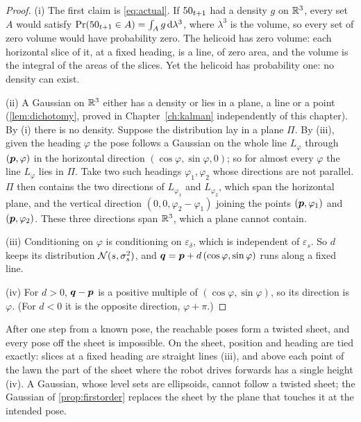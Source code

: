 \begin{proof}
(i) The first claim is \eqref{eq:actual}. If $50_{t+1}$ had a density $g$
on $\mathbb{R}^3$, every set $A$ would satisfy
$\Pr(50_{t+1}\in A)=\int_Ag\,\mathrm d\lambda^3$, where $\lambda^3$ is
the volume, so every set of zero volume would have probability zero. The
helicoid has zero volume: each horizontal slice of it, at a fixed heading,
is a line, of zero area, and the volume is the integral of the areas of the
slices. Yet the helicoid has probability one: no density can exist.

(ii) A Gaussian on $\mathbb{R}^3$ either has a density or lies in a plane, a line
or a point (\cref{lem:dichotomy}, proved in Chapter~\ref{ch:kalman}
independently of this chapter). By (i) there is no density. Suppose the
distribution lay in a plane $\Pi$. By (iii), given the heading $\varphi$
the pose follows a Gaussian on the whole line $L_\varphi$ through
$(\bm{p},\varphi)$ in the horizontal direction $(\cos\varphi,\sin\varphi,0)$;
so for almost every $\varphi$ the line $L_\varphi$ lies in $\Pi$. Take two
such headings $\varphi_1,\varphi_2$ whose directions are not parallel.
$\Pi$ then contains the two directions of $L_{\varphi_1}$ and
$L_{\varphi_2}$, which span the horizontal plane, and the vertical
direction $(0,0,\varphi_2-\varphi_1)$ joining the points $(\bm{p},\varphi_1)$
and $(\bm{p},\varphi_2)$. These three directions span $\mathbb{R}^3$, which a plane
cannot contain.

(iii) Conditioning on $\varphi$ is conditioning on $\varepsilon_\delta$,
which is independent of $\varepsilon_s$. So $d$ keeps its distribution
$\mathcal{N}(s,\sigma_s^2)$, and $\bm{q}=\bm{p}+d\,(\cos\varphi,\sin\varphi)$ runs
along a fixed line.

(iv) For $d>0$, $\bm{q}-\bm{p}$ is a positive multiple of
$(\cos\varphi,\sin\varphi)$, so its direction is $\varphi$. (For $d<0$
it is the opposite direction, $\varphi+\pi$.)
\end{proof}

\begin{inwords}
After one step from a known pose, the reachable poses form a twisted sheet,
and every pose off the sheet is impossible. On the sheet, position and
heading are tied exactly: slices at a fixed heading are straight lines
(iii), and above each point of the lawn the part of the sheet where the
robot drives forwards has a single height (iv). A Gaussian, whose level sets are ellipsoids, cannot follow a twisted
sheet; the Gaussian of \cref{prop:firstorder} replaces the sheet by the
plane that touches it at the intended pose.
\end{inwords}


